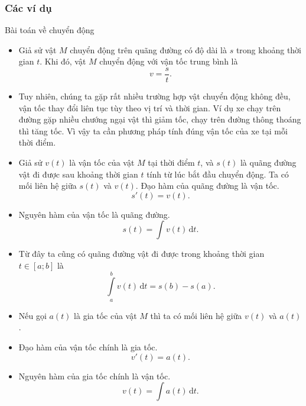 \subsubsection{Các ví dụ}
\begin{dang}{Bài toán về chuyển động}
	\begin{itemize}
		\item Giả sử vật $ M $ chuyển động trên quãng đường có độ dài là $s$ trong khoảng thời gian $t$. Khi đó, vật $ M $ chuyển động với vận tốc trung bình là
		\[v=\dfrac{s}{t}.\]
		\item Tuy nhiên, chúng ta gặp rất nhiều trường hợp vật chuyển động không đều, vận tốc thay đổi liên tục tùy theo vị trí và thời gian. Ví dụ xe chạy trên đường gặp nhiều chướng ngại vật thì giảm tốc, chạy trên đường thông thoáng thì tăng tốc. Vì vậy ta cần phương pháp tính đúng vận tốc của xe tại mỗi thời điểm.
		\item Giả sử $v(t)$ là vận tốc của vật $M$ tại thời điểm $t$, và $s(t)$ là quãng đường vật đi được sau khoảng thời gian $t$ tính từ lúc bắt đầu chuyển động. Ta có mối liên hệ giữa $s(t)$ và $v(t)$. Đạo hàm của quãng đường là vận tốc.
		\[s'(t)=v(t).\]
		\item Nguyên hàm của vận tốc là quãng đường.
		\[s(t)= \int v(t)\mathrm{\,d}t.\]
		\item Từ đây ta cũng có quãng đường vật đi được trong khoảng thời gian $t\in[a;b]$ là
		\[\displaystyle\int\limits_a^b v(t)\mathrm{\,d}t=s(b)-s(a).\]
		\item Nếu gọi $a(t)$ là gia tốc của vật $M$ thì ta có mối liên hệ giữa $v(t)$ và $a(t)$.
		\item Đạo hàm của vận tốc chính là gia tốc.
		\[v'(t)=a(t).\]
		\item Nguyên hàm của gia tốc chính là vận tốc.
		\[v(t)= \int a(t)\mathrm{\,d}t.\]
	\end{itemize}
\end{dang}
